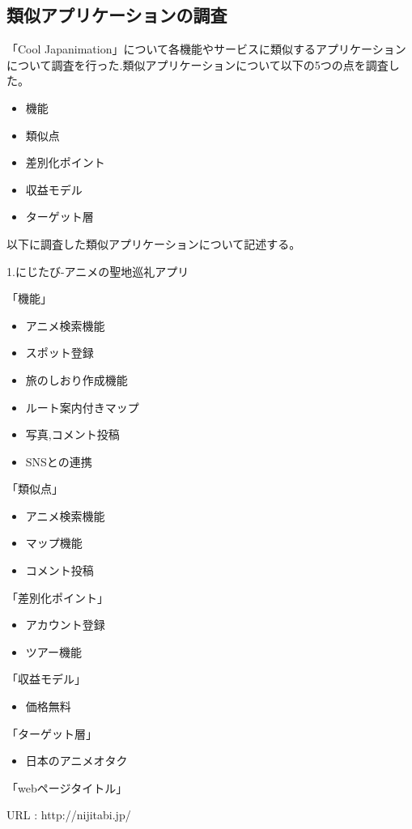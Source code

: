 \subsection{類似アプリケーションの調査}
\par 「Cool Japanimation」について各機能やサービスに類似するアプリケーションについて調査を行った.類似アプリケーションについて以下の5つの点を調査した。
\begin{itemize}
\item 機能
\item 類似点
\item 差別化ポイント
\item 収益モデル
\item ターゲット層
\end{itemize}

\par 以下に調査した類似アプリケーションについて記述する。

\par 1.にじたび-アニメの聖地巡礼アプリ
\par 「機能」
\begin{itemize}
\item アニメ検索機能
\item スポット登録
\item 旅のしおり作成機能
\item ルート案内付きマップ
\item 写真,コメント投稿
\item SNSとの連携
\end{itemize}
「類似点」
\begin{itemize}
\item アニメ検索機能
\item マップ機能
\item コメント投稿
\end{itemize}
「差別化ポイント」
\begin{itemize}
\item アカウント登録
\item ツアー機能
\end{itemize}
「収益モデル」
\begin{itemize}
\item 価格無料
\end{itemize}
「ターゲット層」
\begin{itemize}
\item 日本のアニメオタク
\end{itemize}
「webページタイトル」
\par URL : http://nijitabi.jp/
\\


